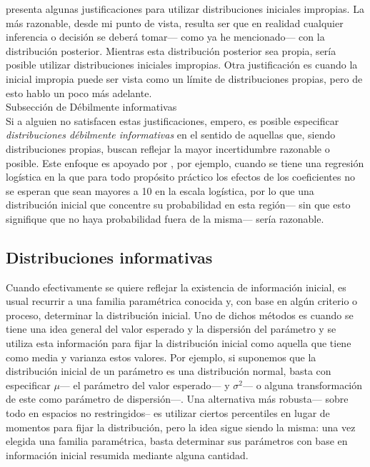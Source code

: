 \textcite{Robert07} presenta algunas justificaciones para utilizar distribuciones iniciales impropias. La más razonable, desde mi punto de vista, resulta ser que en realidad cualquier inferencia o decisión se deberá tomar--- como ya he mencionado--- con la distribución posterior. Mientras esta distribución posterior sea propia, sería posible utilizar distribuciones iniciales impropias. Otra justificación es cuando la inicial impropia puede ser vista como un límite de distribuciones propias, pero de esto hablo un poco más adelante.\\ 

{\color{Red} Subsección de Débilmente informativas}\\ 

Si a alguien no satisfacen estas justificaciones, empero, es posible especificar \textit{distribuciones débilmente informativas} en el sentido de aquellas que, siendo distribuciones propias, buscan reflejar la mayor incertidumbre razonable o posible. Este enfoque es apoyado por \textcite{Gelman13}, por ejemplo, cuando se tiene una regresión logística en la que para todo propósito práctico los efectos de los coeficientes no se esperan que sean mayores a 10 en la escala logística, por lo que una distribución inicial que concentre su probabilidad en esta región--- sin que esto signifique que no haya probabilidad fuera de la misma--- sería razonable. 

\subsection{Distribuciones informativas}

Cuando efectivamente se quiere reflejar la existencia de información inicial, es usual recurrir a una familia paramétrica conocida y, con base en algún criterio o proceso, determinar la distribución inicial. Uno de dichos métodos es cuando se tiene una idea general del valor esperado y la dispersión del parámetro y se utiliza esta información para fijar la distribución inicial como aquella que tiene como media y varianza estos valores. Por ejemplo, si suponemos que la distribución inicial de un parámetro es una distribución normal, basta con especificar $\mu$--- el parámetro del valor esperado--- y $\sigma^2$--- o alguna transformación de este como parámetro de dispersión---. Una alternativa más robusta--- sobre todo en espacios no restringidos-- es utilizar ciertos percentiles en lugar de momentos para fijar la distribución, pero la idea sigue siendo la misma: una vez elegida una familia paramétrica, basta determinar sus parámetros con base en información inicial resumida mediante alguna cantidad.\\


